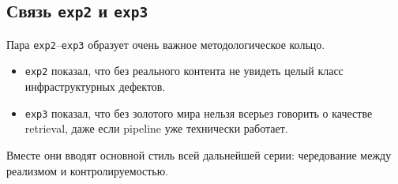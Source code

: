 \subsection{Связь \texttt{exp2} и \texttt{exp3}}

Пара \texttt{exp2}--\texttt{exp3} образует очень важное методологическое кольцо.

\begin{itemize}[leftmargin=2em]
\item \texttt{exp2} показал, что без реального контента не увидеть целый класс
инфраструктурных дефектов.
\item \texttt{exp3} показал, что без золотого мира нельзя всерьез говорить о
качестве retrieval, даже если pipeline уже технически работает.
\end{itemize}

Вместе они вводят основной стиль всей дальнейшей серии: чередование между
реализмом и контролируемостью.
